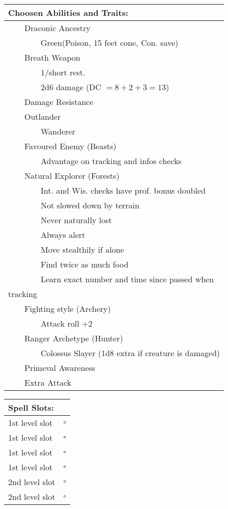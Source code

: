 \documentclass[11pt]{article}
\newcommand{\available}{$\square$}
\newcommand{\tabitem}{~~\llap{--}~~}
\newcommand{\tabtabitem}{~~~~~~\llap{$\bullet$}~~}
\begin{document}
\begin{multicols}{2}
\vspace{4mm}

\noindent \begin{tabularx}{\linewidth}{@{}l}
{\Large \textbf{Choosen Abilities and Traits:}} \\
\hline
\tabitem Draconic Ancestry \\
\tabtabitem Green(Poison, 15 feet cone, Con. save) \\
\tabitem Breath Weapon \\
\tabtabitem 1/short rest. \\
\tabtabitem 2d6 damage (DC $= 8 + 2 + 3 = 13$) \\
\tabitem Damage Resistance \\
\tabitem Outlander \\
\tabtabitem Wanderer \\
\tabitem Favoured Enemy (Beasts) \\
\tabtabitem Advantage on tracking and infos checks \\
\tabitem Natural Explorer (Forests) \\
\tabtabitem Int. and Wis. checks have prof. bonus doubled \\
\tabtabitem Not slowed down by terrain \\
\tabtabitem Never naturally lost \\
\tabtabitem Always alert \\
\tabtabitem Move stealthily if alone \\
\tabtabitem Find twice as much food \\
\tabtabitem Learn exact number and time since passed when \\
tracking \\
\tabitem Fighting style (Archery) \\
\tabtabitem Attack roll +2 \\
\tabitem Ranger Archetype (Hunter) \\
\tabtabitem Colossus Slayer (1d8 extra if creature is damaged) \\
\tabitem Primeval Awareness \\
\tabitem Extra Attack
		\end{tabularx}

\vspace{4mm}

\noindent \begin{tabularx}{\linewidth}{@{}l c}
{\Large \textbf{Spell Slots:}} \\
\hline
1st level slot & \available \\
1st level slot & \available \\
1st level slot & \available \\
1st level slot & \available \\
2nd level slot & \available \\
2nd level slot & \available
		\end{tabularx}


\end{multicols}
\end{document}
